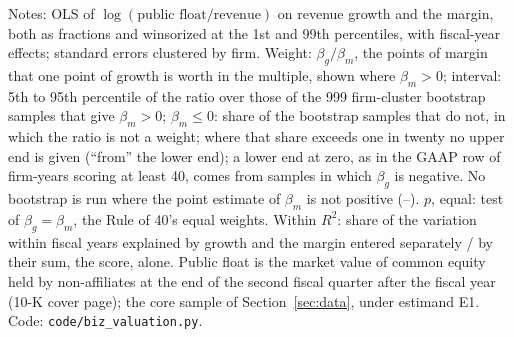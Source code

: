 \begin{table}[!ht]
\par\vspace{2pt}\footnotesize\raggedright Notes: OLS of $\log(\text{public float}/\text{revenue})$ on revenue growth and the margin, both as fractions and winsorized at the 1st and 99th percentiles, with fiscal-year effects; standard errors clustered by firm. Weight: $\beta_g/\beta_m$, the points of margin that one point of growth is worth in the multiple, shown where $\beta_m>0$; interval: 5th to 95th percentile of the ratio over those of the 999 firm-cluster bootstrap samples that give $\beta_m>0$; $\beta_m\le0$: share of the bootstrap samples that do not, in which the ratio is not a weight; where that share exceeds one in twenty no upper end is given (``from'' the lower end); a lower end at zero, as in the GAAP row of firm-years scoring at least 40, comes from samples in which $\beta_g$ is negative. No bootstrap is run where the point estimate of $\beta_m$ is not positive (--). $p$, equal: test of $\beta_g=\beta_m$, the Rule of 40's equal weights. Within $R^2$: share of the variation within fiscal years explained by growth and the margin entered separately / by their sum, the score, alone. Public float is the market value of common equity held by non-affiliates at the end of the second fiscal quarter after the fiscal year (10-K cover page); the core sample of Section~\ref{sec:data}, under estimand E1. Code: \texttt{code/biz\_valuation.py}.
\end{table}
